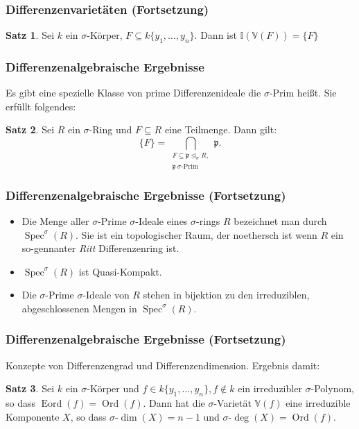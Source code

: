 \documentclass{beamer}
\def\I{\mathbb{I}}
\def\VV{\mathbb{V}}
\def\p{\mathfrak{p}}
\def\s{\sigma}
\def\si{\unlhd_{\sigma}}
\def\Spec{\operatorname{Spec}}
\theoremstyle{definition}
\newtheorem{satz}{Satz}[section]
\begin{document}
\begin{frame}\frametitle{Differenzenvarietäten (Fortsetzung)}
\begin{satz}
Sei $k$ ein $\s$-Körper, $F \subseteq k\{y_1,\ldots,y_n\}$.
Dann ist $\I(\VV(F)) = \{F\}$
\end{satz}
\end{frame}

\begin{frame}\frametitle{Differenzenalgebraische Ergebnisse}
Es gibt eine spezielle Klasse von prime Differenzenideale die $\s$-Prim heißt. Sie erfüllt folgendes:
\begin{satz}
Sei $R$ ein $\s$-Ring und $F \subseteq R$ eine Teilmenge. Dann gilt:
\begin{equation*} \{F\} = \bigcap_{\substack{F \subseteq \p \si R, \\ \p ~ \s\text{-Prim}}} \p. \end{equation*}
\end{satz}
\end{frame}

\begin{frame}\frametitle{Differenzenalgebraische Ergebnisse (Fortsetzung)}
\begin{itemize}
\item Die Menge aller $\s$-Prime $\s$-Ideale eines $\s$-rings $R$ bezeichnet man durch $\Spec^\s(R)$. 
Sie ist ein topologischer Raum, der noethersch ist wenn $R$ ein so-gennanter \emph{Ritt} Differenzenring ist.
\item $\Spec^\s(R)$ ist Quasi-Kompakt.
\item Die $\s$-Prime $\s$-Ideale von $R$ stehen in bijektion zu den irreduziblen, abgeschlossenen Mengen in $\Spec^\s(R)$.
\end{itemize}
\end{frame}

\begin{frame}\frametitle{Differenzenalgebraische Ergebnisse (Fortsetzung)}
Konzepte von Differenzengrad und Differenzendimension. Ergebnis damit: 
\begin{satz}\label{irredcomp}
Sei $k$ ein $\s$-Körper und $f \in k\{y_1,\ldots,y_n\}, f \notin k$ ein irreduzibler $\s$-Polynom, so dass $\operatorname{Eord}(f) = \operatorname{Ord}(f)$. Dann hat die $\s$-Varietät $\VV(f)$ eine irreduzible Komponente $X$, so dass $\s$-$\dim(X) = n-1$ und $\s$-$\operatorname{deg}(X) = \operatorname{Ord}(f)$.
\end{satz}
\end{frame}
\end{document}
